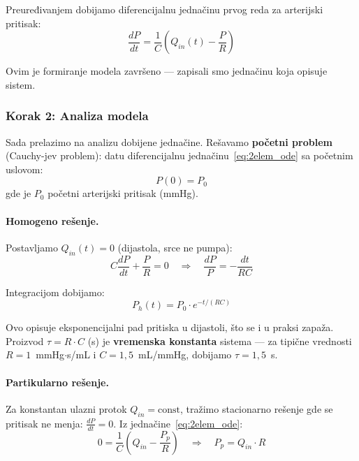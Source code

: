 \documentclass[12pt,a4paper]{article}
\begin{document}
Preuređivanjem dobijamo diferencijalnu jednačinu prvog reda za arterijski pritisak:
\begin{equation}
    \boxed{\frac{dP}{dt} = \frac{1}{C} \left( Q_{in}(t) - \frac{P}{R} \right)}
    \label{eq:2elem_ode}
\end{equation}

Ovim je formiranje modela završeno --- zapisali smo jednačinu koja opisuje sistem.

\subsubsection{Korak 2: Analiza modela}

Sada prelazimo na analizu dobijene jednačine. Rešavamo \textbf{početni problem} (Cauchy-jev problem): datu diferencijalnu jednačinu~\eqref{eq:2elem_ode} sa početnim uslovom:
\begin{equation}
    P(0) = P_0
\end{equation}
gde je $P_0$ početni arterijski pritisak (mmHg).

\paragraph{Homogeno rešenje.}
Postavljamo $Q_{in}(t) = 0$ (dijastola, srce ne pumpa):
\begin{equation}
    C \frac{dP}{dt} + \frac{P}{R} = 0 \quad \Longrightarrow \quad \frac{dP}{P} = -\frac{dt}{RC}
\end{equation}

Integracijom dobijamo:
\begin{equation}
    P_h(t) = P_0 \cdot e^{-t/(RC)}
    \label{eq:homogeneous}
\end{equation}

Ovo opisuje eksponencijalni pad pritiska u dijastoli, što se i u praksi zapaža. Proizvod $\tau = R \cdot C$ (s) je \textbf{vremenska konstanta} sistema --- za tipične vrednosti $R = 1$~mmHg$\cdot$s/mL i $C = 1{,}5$~mL/mmHg, dobijamo $\tau = 1{,}5$~s.

\paragraph{Partikularno rešenje.}
Za konstantan ulazni protok $Q_{in} = \text{const}$, tražimo stacionarno rešenje gde se pritisak ne menja: $\frac{dP}{dt} = 0$. Iz jednačine~\eqref{eq:2elem_ode}:
\begin{equation}
    0 = \frac{1}{C} \left( Q_{in} - \frac{P_p}{R} \right) \quad \Longrightarrow \quad P_p = Q_{in} \cdot R
    \label{eq:particular}
\end{equation}
\end{document}
